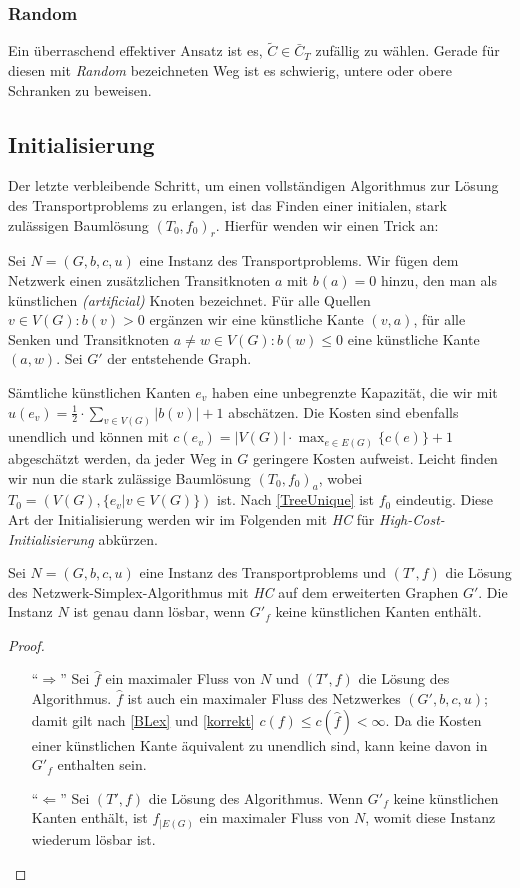 \subsubsection{Random}
Ein überraschend effektiver Ansatz ist es, $\tilde{C}\in \bar{C}_T$ zufällig zu wählen. Gerade für diesen mit \emph{Random} bezeichneten Weg ist es schwierig, untere oder obere Schranken zu beweisen.

\subsection{Initialisierung} \label{ch:init}
Der letzte verbleibende Schritt, um einen vollständigen Algorithmus zur Lösung des Transportproblems zu erlangen, ist das Finden einer initialen, stark zulässigen Baumlösung $(T_0,f_0)_r$. Hierfür wenden wir einen Trick an:

Sei $N=(G,b,c,u)$ eine Instanz des Transportproblems. Wir fügen dem Netzwerk einen zusätzlichen Transitknoten $a$ mit $b(a)=0$ hinzu, den man als künstlichen \textit{(artificial)} Knoten bezeichnet. Für alle Quellen $v\in V(G):b(v)>0$ ergänzen wir eine künstliche Kante $(v,a)$, für alle Senken und Transitknoten $a\neq w\in V(G):b(w)\leq0$ eine künstliche Kante $(a,w)$. Sei $G'$ der entstehende Graph.

Sämtliche künstlichen Kanten $e_v$ haben eine unbegrenzte Kapazität, die wir mit $u(e_v)=\frac{1}{2}\cdot\sum_{v\in V(G)} |b(v)| + 1$ abschätzen. Die Kosten sind ebenfalls unendlich und können mit $c(e_v)=|V(G)|\cdot\max_{e\in E(G)}\{c(e)\}+1$ abgeschätzt werden, da jeder Weg in $G$ geringere Kosten aufweist. Leicht finden wir nun die stark zulässige Baumlösung $(T_0,f_0)_a$, wobei $T_0=(V(G),\{e_v|v\in V(G)\})$ ist. Nach \cref{TreeUnique} ist $f_0$ eindeutig. Diese Art der Initialisierung werden wir im Folgenden mit \emph{HC} für \emph{High-Cost-Initialisierung} abkürzen.

\begin{lem}Sei $N=(G,b,c,u)$ eine Instanz des Transportproblems und $(T',f)$ die Lösung des Netzwerk-Simplex-Algorithmus mit \emph{HC} auf dem erweiterten Graphen $G'$. Die Instanz $N$ ist genau dann lösbar, wenn $G'_f$ keine künstlichen Kanten enthält.\end{lem}
\begin{proof}\label{solvable}\mbox{}
\begin{itemize}[topsep=0pt]
	\item[\enquote{$\Rightarrow$}] Sei $\hat{f}$ ein maximaler Fluss von $N$ und $(T',f)$ die Lösung des Algorithmus. $\hat{f}$ ist auch ein maximaler Fluss des Netzwerkes $(G',b,c,u)$; damit gilt nach \cref{BLex} und \cref{korrekt} $c(f)\leq c(\hat{f})<\infty$. Da die Kosten einer künstlichen Kante äquivalent zu unendlich sind, kann keine davon in $G'_f$ enthalten sein.
	
	\item[\enquote{$\Leftarrow$}] Sei $(T',f)$ die Lösung des Algorithmus. Wenn $G'_f$ keine künstlichen Kanten enthält, ist $f_{|E(G)}$ ein maximaler Fluss von $N$, womit diese Instanz wiederum lösbar ist.\qedhere
\end{itemize}
\end{proof}

